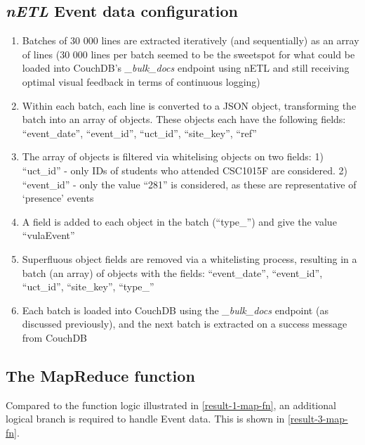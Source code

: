 \subsection*{\textit{nETL} Event data configuration}
\begin{enumerate}
    \item Batches of 30 000 lines are extracted iteratively (and sequentially) as an array of lines (30 000 lines per batch seemed to be the sweetspot for what could be loaded into CouchDB's \textit{\_bulk\_docs} endpoint using nETL and still receiving optimal visual feedback in terms of continuous logging)
    \item Within each batch, each line is converted to a JSON object, transforming the batch into an array of objects. These objects each have the following fields: ``event\_date'', ``event\_id'', ``uct\_id'',  ``site\_key'', ``ref''
    \item The array of objects is filtered via whitelising objects on two fields: 1) ``uct\_id'' - only IDs of students who attended CSC1015F are considered. 2) ``event\_id'' - only the value ``281'' is considered, as these are representative of `presence' events
    \item A field is added to each object in the batch (``type\_'') and give the value ``vulaEvent''
    \item Superfluous object fields are removed via a whitelisting process, resulting in a batch (an array) of objects with the fields: ``event\_date'', ``event\_id'', ``uct\_id'', ``site\_key'', ``type\_''
    \item Each batch is loaded into CouchDB using the \textit{\_bulk\_docs} endpoint (as discussed previously), and the next batch is extracted on a success message from CouchDB
\end{enumerate}

\subsection*{The MapReduce function}
Compared to the function logic illustrated in \ref{result-1-map-fn}, an additional logical branch is required to handle Event data. This is shown in \ref{result-3-map-fn}.


